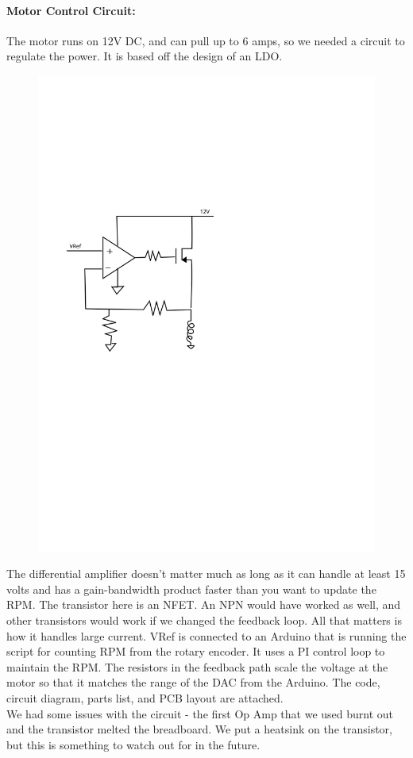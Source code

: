 \documentclass[12pt]{report}
\begin{document}
\paragraph{Motor Control Circuit: } The motor runs on 12V DC, and can pull up to 6 amps, so we needed a circuit to regulate the power. It is based off the design of an LDO.
\begin{figure}[h]
\includegraphics[scale=0.7]{circuit}
\end{figure}
The differential amplifier doesn't matter much as long as it can handle at least 15 volts and has a gain-bandwidth product faster than you want to update the RPM. The transistor here is an NFET. An NPN would have worked as well, and other transistors would work if we changed the feedback loop. All that matters is how it handles large current. VRef is connected to an Arduino that is running the script for counting RPM from the rotary encoder. It uses a PI control loop to maintain the RPM. The resistors in the feedback path scale the voltage at the motor so that it matches the range of the DAC from the Arduino. The code, circuit diagram, parts list, and PCB layout are attached.\\
We had some issues with the circuit - the first Op Amp that we used burnt out and the transistor melted the breadboard. We put a heatsink on the transistor, but this is something to watch out for in the future.
\end{document}
